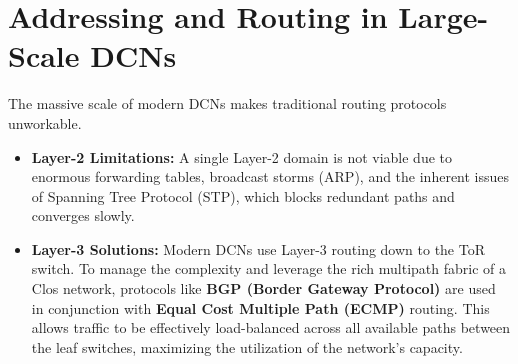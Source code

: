 \section{Addressing and Routing in Large-Scale DCNs}
The massive scale of modern DCNs makes traditional routing protocols unworkable.
\begin{itemize}
    \item \textbf{Layer-2 Limitations:} A single Layer-2 domain is not viable due to enormous forwarding tables, broadcast storms (ARP), and the inherent issues of Spanning Tree Protocol (STP), which blocks redundant paths and converges slowly.
    \item \textbf{Layer-3 Solutions:} Modern DCNs use Layer-3 routing down to the ToR switch. To manage the complexity and leverage the rich multipath fabric of a Clos network, protocols like \textbf{BGP (Border Gateway Protocol)} are used in conjunction with \textbf{Equal Cost Multiple Path (ECMP)} routing. This allows traffic to be effectively load-balanced across all available paths between the leaf switches, maximizing the utilization of the network's capacity.
\end{itemize}